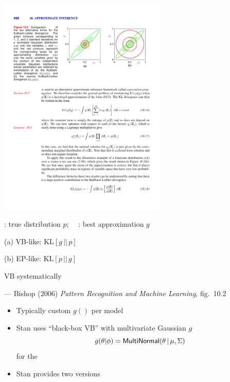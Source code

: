 \documentclass[10pt]{report}
\begin{document}
\vspace*{-4pt}
\begin{center}
\includegraphics[width=0.6\textwidth]{img/bishop-fig-10-2.pdf}
\end{center}
\vspace*{-10pt}
\begin{subitemize}
\item {}: true distribution $p$; \ \ : best
  approximation $g$
\begin{subitemize}
\item[(a)] VB-like: $\mbox{KL}[g \, || \, p]$
\item[(b)] EP-like: $\mbox{KL}[p \, || \, g]$
\end{subitemize}
\item VB systematically 
\end{subitemize}
\vfill \hfill
{\footnotesize  --- Bishop (2006) {\slshape Pattern Recognition and Machine Learning}, fig.~10.2}

\begin{itemize}
\item Typically custom $g()$ per model
\item Stan uses ``black-box VB'' with multivariate Gaussian $g$
\[
g(\theta|\phi) = \text{\sf MultiNormal}(\theta \, | \, \mu, \Sigma)
\]
for the 
\item Stan provides two versions
\end{itemize}
\end{document}
